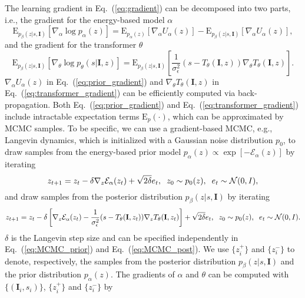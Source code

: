 \documentclass{article}
\begin{document}
The learning gradient in Eq.~(\ref{eq:gradient}) can be decomposed into two parts, i.e., the gradient for the energy-based model $\alpha$
\begin{equation}
    \text{E}_{p_{\beta}(z|s,\textbf{I})}[\nabla_{\alpha} \log p_{\alpha}(z)]= \text{E}_{p_{\alpha}(z)}[\nabla_{\alpha} U_{\alpha}(z)]-\text{E}_{p_{\beta}(z|s,\textbf{I})}[\nabla_{\alpha} U_{\alpha}(z)], \label{eq:prior_gradient}
\end{equation}
and the gradient for the transformer $\theta$
\begin{equation}
    \text{E}_{p_{\beta}(z|s,\textbf{I})}[\nabla_{\theta} \log p_{\theta}(s|\textbf{I},z)]=\text{E}_{p_{\beta}(z|s,\textbf{I})}\left[\frac{1}{\sigma_{\epsilon}^2}(s-T_{\theta}(\textbf{I},z)) \nabla_{\theta} T_{\theta}(\textbf{I},z)\right]. \label{eq:transformer_gradient}
\end{equation}
$\nabla_{\alpha} U_{\alpha}(z)$ in Eq.~(\ref{eq:prior_gradient}) and
$\nabla_{\theta} T_{\theta}(\textbf{I},z)$ in Eq.~(\ref{eq:transformer_gradient}) can be efficiently computed via back-propagation. Both Eq.~(\ref{eq:prior_gradient}) and Eq.~(\ref{eq:transformer_gradient}) include intractable expectation terms $\text{E}_{p}(\cdot)$, which can be approximated by MCMC samples. To be specific, we can use a gradient-based MCMC, e.g., Langevin dynamics, which is initialized with a Gaussian noise distribution $p_0$, to draw samples from the energy-based prior model $p_{\alpha}(z) \propto \exp \left[-\mathcal{E}_{\alpha}(z)\right]$ by iterating
\begin{equation}
    z_{t+1} = z_{t} - \delta \nabla_z \mathcal{E}_{\alpha}(z_t) + \sqrt{2\delta} e_t, \hspace{2mm} z_0\sim p_{0}(z), \hspace{2mm} e_t \sim \mathcal{N}(0,I),
    \label{eq:MCMC_prior}
\end{equation}
and draw samples from the posterior distribution $p_{\beta}(z|s, \textbf{I})$ by iterating
\begin{equation}
    z_{t+1} = z_{t} - \delta  \left[\nabla_{z} \mathcal{E}_{\alpha}(z_t)-\frac{1}{\sigma_{\epsilon}^2}(s-T_{\theta}(\textbf{I},z_t)) \nabla_{z} T_{\theta}(\textbf{I},z_t) \right] + \sqrt{2\delta} e_t, \hspace{2mm} z_0\sim p_{0}(z), \hspace{2mm} e_t \sim \mathcal{N}(0,I).
    \label{eq:MCMC_post}
\end{equation}
$\delta$ is the Langevin step size and can be specified independently in Eq.~(\ref{eq:MCMC_prior}) and Eq.~(\ref{eq:MCMC_post}). We use $\{z_i^{+}\}$ and $\{z_i^{-}\}$ to denote, respectively, the samples from the posterior distribution $p_{\beta}(z|s,\textbf{I})$ and the prior distribution $p_{\alpha}(z)$. The gradients of $\alpha$ and $\theta$ can be computed with $\{(\textbf{I}_i, s_i)\}$, $\{z_i^{+}\}$ and $\{z_i^{-}\}$ by
\end{document}
